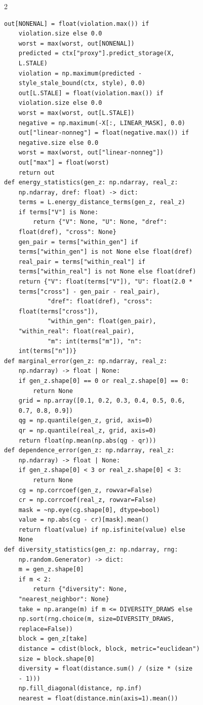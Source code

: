 \begin{multicols}{2}
\begin{Verbatim}[fontsize=\scriptsize]
    out[NONENAL] = float(violation.max()) if
    violation.size else 0.0
    worst = max(worst, out[NONENAL])
    predicted = ctx["proxy"].predict_storage(X,
    L.STALE)
    violation = np.maximum(predicted -
    style_stale_bound(ctx, style), 0.0)
    out[L.STALE] = float(violation.max()) if
    violation.size else 0.0
    worst = max(worst, out[L.STALE])
    negative = np.maximum(-X[:, LINEAR_MASK], 0.0)
    out["linear-nonneg"] = float(negative.max()) if
    negative.size else 0.0
    worst = max(worst, out["linear-nonneg"])
    out["max"] = float(worst)
    return out
def energy_statistics(gen_z: np.ndarray, real_z:
    np.ndarray, dref: float) -> dict:
    terms = L.energy_distance_terms(gen_z, real_z)
    if terms["V"] is None:
        return {"V": None, "U": None, "dref":
    float(dref), "cross": None}
    gen_pair = terms["within_gen"] if
    terms["within_gen"] is not None else float(dref)
    real_pair = terms["within_real"] if
    terms["within_real"] is not None else float(dref)
    return {"V": float(terms["V"]), "U": float(2.0 *
    terms["cross"] - gen_pair - real_pair),
            "dref": float(dref), "cross":
    float(terms["cross"]),
            "within_gen": float(gen_pair),
    "within_real": float(real_pair),
            "m": int(terms["m"]), "n":
    int(terms["n"])}
def marginal_error(gen_z: np.ndarray, real_z:
    np.ndarray) -> float | None:
    if gen_z.shape[0] == 0 or real_z.shape[0] == 0:
        return None
    grid = np.array([0.1, 0.2, 0.3, 0.4, 0.5, 0.6,
    0.7, 0.8, 0.9])
    qg = np.quantile(gen_z, grid, axis=0)
    qr = np.quantile(real_z, grid, axis=0)
    return float(np.mean(np.abs(qg - qr)))
def dependence_error(gen_z: np.ndarray, real_z:
    np.ndarray) -> float | None:
    if gen_z.shape[0] < 3 or real_z.shape[0] < 3:
        return None
    cg = np.corrcoef(gen_z, rowvar=False)
    cr = np.corrcoef(real_z, rowvar=False)
    mask = ~np.eye(cg.shape[0], dtype=bool)
    value = np.abs(cg - cr)[mask].mean()
    return float(value) if np.isfinite(value) else
    None
def diversity_statistics(gen_z: np.ndarray, rng:
    np.random.Generator) -> dict:
    m = gen_z.shape[0]
    if m < 2:
        return {"diversity": None,
    "nearest_neighbor": None}
    take = np.arange(m) if m <= DIVERSITY_DRAWS else
    np.sort(rng.choice(m, size=DIVERSITY_DRAWS,
    replace=False))
    block = gen_z[take]
    distance = cdist(block, block, metric="euclidean")
    size = block.shape[0]
    diversity = float(distance.sum() / (size * (size
    - 1)))
    np.fill_diagonal(distance, np.inf)
    nearest = float(distance.min(axis=1).mean())

\end{Verbatim}
\end{multicols}
